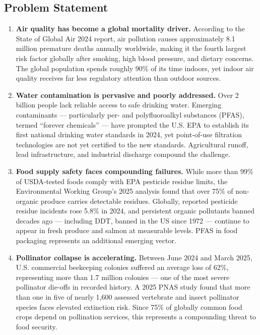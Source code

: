 \documentclass[11pt,letterpaper]{article}
\begin{document}
\subsection{Problem Statement}

\begin{enumerate}[leftmargin=*, label=\textbf{\arabic*.}]

\item \textbf{Air quality has become a global mortality driver.} According to the State of Global Air 2024 report, air pollution causes approximately 8.1 million premature deaths annually worldwide, making it the fourth largest risk factor globally after smoking, high blood pressure, and dietary concerns. The global population spends roughly 90\% of its time indoors, yet indoor air quality receives far less regulatory attention than outdoor sources.

\item \textbf{Water contamination is pervasive and poorly addressed.} Over 2 billion people lack reliable access to safe drinking water. Emerging contaminants --- particularly per- and polyfluoroalkyl substances (PFAS), termed ``forever chemicals'' --- have prompted the U.S. EPA to establish its first national drinking water standards in 2024, yet point-of-use filtration technologies are not yet certified to the new standards. Agricultural runoff, lead infrastructure, and industrial discharge compound the challenge.

\item \textbf{Food supply safety faces compounding failures.} While more than 99\% of USDA-tested foods comply with EPA pesticide residue limits, the Environmental Working Group's 2025 analysis found that over 75\% of non-organic produce carries detectable residues. Globally, reported pesticide residue incidents rose 5.8\% in 2024, and persistent organic pollutants banned decades ago --- including DDT, banned in the US since 1972 --- continue to appear in fresh produce and salmon at measurable levels. PFAS in food packaging represents an additional emerging vector.

\item \textbf{Pollinator collapse is accelerating.} Between June 2024 and March 2025, U.S. commercial beekeeping colonies suffered an average loss of 62\%, representing more than 1.7 million colonies --- one of the most severe pollinator die-offs in recorded history. A 2025 PNAS study found that more than one in five of nearly 1,600 assessed vertebrate and insect pollinator species faces elevated extinction risk. Since 75\% of globally common food crops depend on pollination services, this represents a compounding threat to food security.


\end{enumerate}
\end{document}
